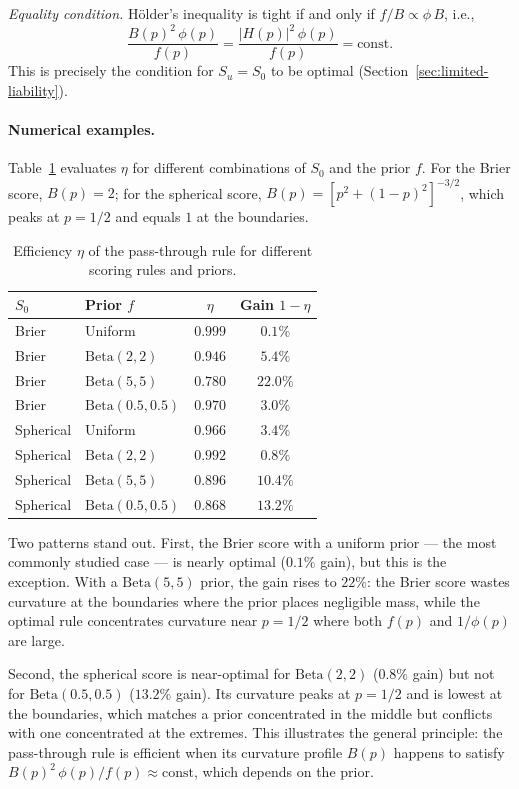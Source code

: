 \documentclass[11pt]{article}
\begin{document}
\emph{Equality condition.} H\"older's inequality is tight if and only if $f/B \propto \phi\,B$, i.e.,
\[
\frac{B(p)^2\,\phi(p)}{f(p)} = \frac{|H(p)|^2\,\phi(p)}{f(p)} = \text{const}.
\]
This is precisely the condition for $S_u = S_0$ to be optimal (Section~\ref{sec:limited-liability}).

\paragraph{Numerical examples.} Table~\ref{tab:efficiency} evaluates $\eta$ for different combinations of $S_0$ and the prior $f$. For the Brier score, $B(p) = 2$; for the spherical score, $B(p) = [p^2 + (1-p)^2]^{-3/2}$, which peaks at $p = 1/2$ and equals $1$ at the boundaries.

\begin{table}[h]
\centering
\caption{Efficiency $\eta$ of the pass-through rule for different scoring rules and priors.}
\label{tab:efficiency}
\begin{tabular}{ll|cc}
$S_0$ & Prior $f$ & $\eta$ & Gain $1-\eta$ \\
\hline
Brier & Uniform & $0.999$ & $0.1\%$ \\
Brier & $\mathrm{Beta}(2,2)$ & $0.946$ & $5.4\%$ \\
Brier & $\mathrm{Beta}(5,5)$ & $0.780$ & $22.0\%$ \\
Brier & $\mathrm{Beta}(0.5, 0.5)$ & $0.970$ & $3.0\%$ \\
\hline
Spherical & Uniform & $0.966$ & $3.4\%$ \\
Spherical & $\mathrm{Beta}(2,2)$ & $0.992$ & $0.8\%$ \\
Spherical & $\mathrm{Beta}(5,5)$ & $0.896$ & $10.4\%$ \\
Spherical & $\mathrm{Beta}(0.5, 0.5)$ & $0.868$ & $13.2\%$ \\
\end{tabular}
\end{table}

Two patterns stand out. First, the Brier score with a uniform prior --- the most commonly studied case --- is nearly optimal ($0.1\%$ gain), but this is the exception. With a $\mathrm{Beta}(5,5)$ prior, the gain rises to $22\%$: the Brier score wastes curvature at the boundaries where the prior places negligible mass, while the optimal rule concentrates curvature near $p = 1/2$ where both $f(p)$ and $1/\phi(p)$ are large.

Second, the spherical score is near-optimal for $\mathrm{Beta}(2,2)$ ($0.8\%$ gain) but not for $\mathrm{Beta}(0.5, 0.5)$ ($13.2\%$ gain). Its curvature peaks at $p = 1/2$ and is lowest at the boundaries, which matches a prior concentrated in the middle but conflicts with one concentrated at the extremes. This illustrates the general principle: the pass-through rule is efficient when its curvature profile $B(p)$ happens to satisfy $B(p)^2\,\phi(p)/f(p) \approx \text{const}$, which depends on the prior.
\end{document}
